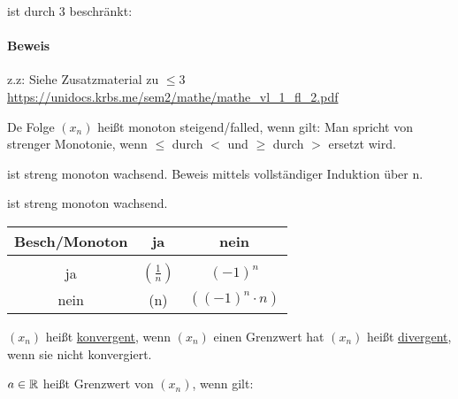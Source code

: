 \documentclass{../tudscript}
\begin{document}
                ist durch 3 beschränkt:
                \paragraph{Beweis}
                z.z:
                Siehe Zusatzmaterial zu $\leq 3$ \url{https://unidocs.krbs.me/sem2/mathe/mathe_vl_1_fl_2.pdf} 

                De Folge $(x_n)$ heißt monoton steigend/falled, wenn gilt:
                Man spricht von strenger Monotonie, wenn $\leq$ durch $<$ und $\geq$ durch $>$ ersetzt wird.


                ist streng monoton wachsend.
                Beweis mittels vollständiger Induktion über n.

                ist streng monoton wachsend.
                
            \begin{tabular}{c|cc}
	            Besch/Monoton & ja & nein \\
	            \hline &&\\
	            ja & $(\frac{1}{n})$ & $(-1)^n$ \\
	            nein & (n) & $((-1)^n \cdot n)$
            \end{tabular}

           $(x_n)$ heißt \underline{konvergent}, wenn $(x_n)$ einen Grenzwert
           hat
	   $(x_n)$ heißt \underline{divergent}, wenn sie nicht konvergiert.

            $a \in \mathbb{R}$ heißt Grenzwert von $(x_n)$, wenn gilt:
            
\end{document}
